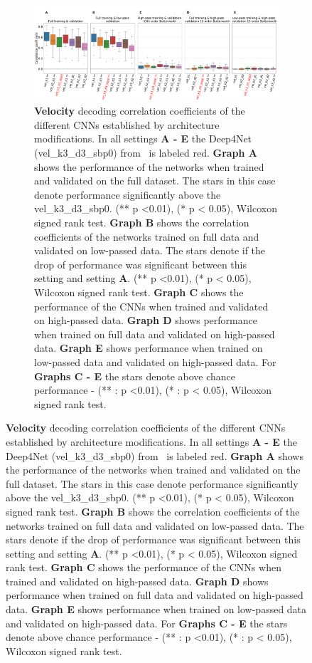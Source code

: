 \begin{itemize}
\begin{figure}[!htpb]
\centering
\begin{subfigure}[b]{\textwidth}
   \includegraphics[width=1\linewidth]{img/ch4/original_setting_vel_performance_comparison}
   \caption{\textbf{Velocity} decoding correlation coefficients of the different CNNs established by architecture modifications. In all settings \textbf{
   A - E} the Deep4Net (vel\_k3\_d3\_sbp0) from~\cite{Hammer-2021} is labeled red. \textbf{Graph A} shows the performance of the networks when trained and validated on the full dataset. The stars in this case denote performance significantly above the vel\_k3\_d3\_sbp0. (** p <0.01), (* p < 0.05), Wilcoxon signed rank test.
   \textbf{Graph B} shows the correlation coefficients of the networks trained on full data and validated on low-passed data. 
   The stars denote if the drop of performance was significant between this setting and setting \textbf{A}. (** p <0.01), (* p < 0.05), Wilcoxon signed rank test.
   \textbf{Graph C} shows the performance of the CNNs when trained and validated on high-passed data. \textbf{Graph D} shows performance when trained on full data and validated on high-passed data. \textbf{Graph E} shows performance when trained on low-passed data and validated on high-passed data. For \textbf{Graphs C - E} the stars denote above chance performance - (** : p <0.01), (* : p < 0.05), Wilcoxon signed rank test.}
   \label{fig:original-performances-velocity} 
\end{subfigure}
\end{figure}

\begin{figure}
\ContinuedFloat


\end{figure}
\end{itemize}
